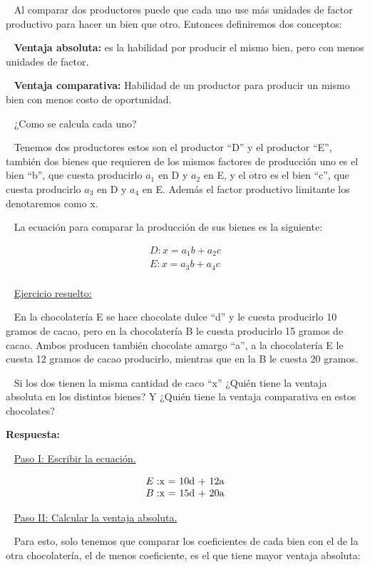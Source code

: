 \documentclass[
  letterpaper,
  DIV=11,
  numbers=noendperiod]{scrreport}
\begin{document}
~ Al comparar dos productores puede que cada uno use más unidades de
factor productivo para hacer un bien que otro. Entonces definiremos dos
conceptos:

~ \textbf{Ventaja absoluta:} es la habilidad por producir el mismo bien,
pero con menos unidades de factor.

~ \textbf{Ventaja comparativa:} Habilidad de un productor para producir
un mismo bien con menos costo de oportunidad.

~ ¿Como se calcula cada uno?

~ Tenemos dos productores estos son el productor ``D'' y el productor
``E'', también dos bienes que requieren de los mismos factores de
producción uno es el bien ``b'', que cuesta producirlo \(a_1\) en D y
\(a_2\) en E, y el otro es el bien ``c'', que cuesta producirlo \(a_3\)
en D y \(a_4\) en E. Además el factor productivo limitante los
denotaremos como x.

~ La ecuación para comparar la producción de sus bienes es la siguiente:

\[
\begin{matrix}
D: x = a_1 b + a_2 c\\
E: x = a_3 b + a_4 c\\
\end{matrix}
\]

~ \ul{Ejercicio resuelto:}

~ En la chocolatería E se hace chocolate dulce ``d'' y le cuesta
producirlo 10 gramos de cacao, pero en la chocolatería B le cuesta
producirlo 15 gramos de cacao. Ambos producen también chocolate amargo
``a'', a la chocolatería E le cuesta 12 gramos de cacao producirlo,
mientras que en la B le cuesta 20 gramos.

~ Si los dos tienen la misma cantidad de caco ``x'' ¿Quién tiene la
ventaja absoluta en los distintos bienes? Y ¿Quién tiene la ventaja
comparativa en estos chocolates?

\textbf{Respuesta:}

~ \ul{Paso I: Escribir la ecuación.}

\[
\begin{matrix}    E: $x = 10d + 12a$ \\    B: $x = 15d + 20a$\end{matrix}
\]

~ \ul{Paso II: Calcular la ventaja absoluta.}

~ Para esto, solo tenemos que comparar los coeficientes de cada bien con
el de la otra chocolatería, el de menos coeficiente, es el que tiene
mayor ventaja absoluta:
\end{document}
